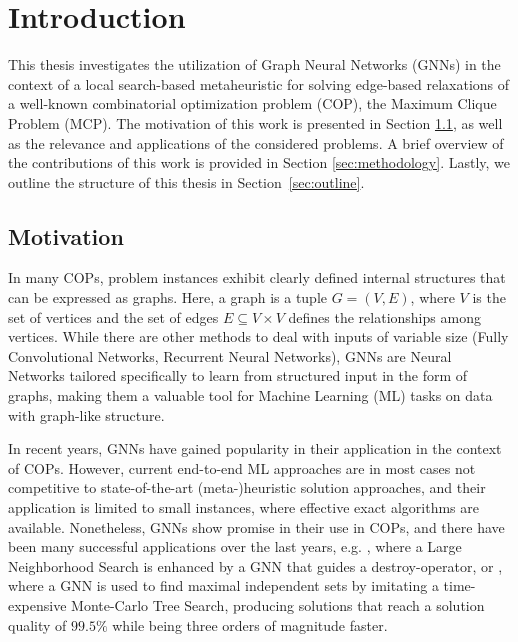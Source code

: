 \documentclass[draft,final]{vutinfth} %
\begin{document}

\tableofcontents %

\mainmatter

\chapter{Introduction}

This thesis investigates the utilization of Graph Neural Networks (GNNs) in the context of a local search-based metaheuristic for solving edge-based relaxations of a well-known combinatorial optimization problem (COP), the Maximum Clique Problem (MCP).
The motivation of this work is presented in Section \ref{sec:motivation}, as well as the relevance and applications of the considered problems. A brief overview of the contributions of this work is provided in Section \ref{sec:methodology}. Lastly, we outline the structure of this thesis in Section~\ref{sec:outline}.

\section{Motivation}\label{sec:motivation}
In many COPs, problem instances exhibit clearly defined internal structures that can be expressed as graphs. Here, a graph is a tuple $G = (V, E)$, where $V$ is the set of vertices and the set of edges $E \subseteq V \times V$ defines the relationships among vertices. While there are other methods to deal with inputs of variable size (Fully Convolutional Networks, Recurrent Neural Networks), GNNs are Neural Networks tailored specifically to learn from structured input in the form of graphs, making them a valuable tool for Machine Learning (ML) tasks on data with graph-like structure.   

In recent years, GNNs have gained popularity in their application in the context of COPs. However, current end-to-end ML approaches are in most cases not competitive to state-of-the-art (meta-)heuristic solution approaches, and their application is limited to small instances, where effective exact algorithms are available. Nonetheless, GNNs show promise in their use in COPs, and there have been many successful applications over the last years, e.g. 
\cite{Oberweger2022}, where a Large Neighborhood Search is enhanced by a GNN that guides a destroy-operator, or \cite{NEURIPS2021_0db2e204}, where a GNN is used to find maximal independent sets by imitating a time-expensive Monte-Carlo Tree Search, producing solutions that reach a solution quality of $99.5\%$ while being three orders of magnitude faster. 
\end{document}
